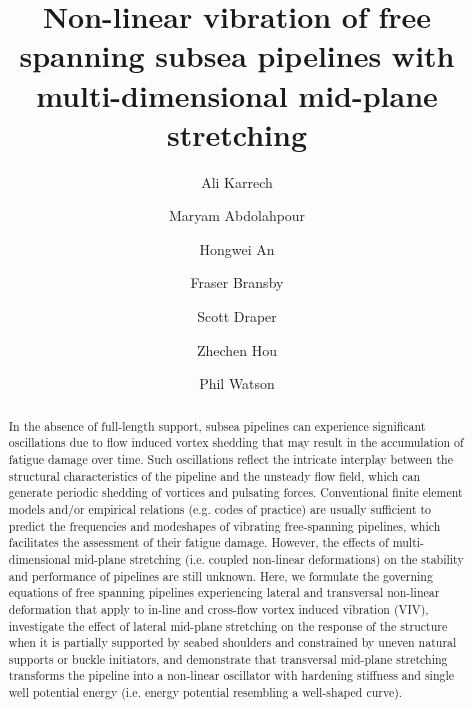 \documentclass[3p,doublespacing,authoryear,11pt]{elsarticle} %
\begin{document}
\begin{frontmatter}
\title{Non-linear vibration of free spanning subsea pipelines with multi-dimensional mid-plane stretching}   
\author[label1]{Ali Karrech}  
\author[label1,label2]{Maryam Abdolahpour}  
\author[label1]{Hongwei An}  
\author[label1,label2]{Fraser Bransby}  
\author[label1,label2]{Scott Draper}   
\author[label2]{Zhechen Hou}
\author[label2]{Phil Watson}  
%
\address[label1]{School of Engineering, University of Western Australia, 35 Stirling Hwy, Crawley WA 6009, Western Australia}
\address[label2]{Oceans Graduate School, University of Western Australia, 35 Stirling Hwy, Crawley WA 6009, Western Australia} 

\begin{abstract} 
In the absence of full-length support, subsea pipelines can experience significant oscillations due to flow induced vortex shedding that may result in the accumulation of fatigue damage over time. Such oscillations reflect the intricate interplay between the structural characteristics of the pipeline and the unsteady flow field, which can generate periodic shedding of vortices and pulsating forces. Conventional finite element models and/or empirical relations (e.g. codes of practice) are usually sufficient to predict the frequencies and modeshapes of vibrating free-spanning pipelines, which facilitates the assessment of their fatigue damage. However, the effects of multi-dimensional mid-plane stretching (i.e. coupled non-linear deformations) on the stability and performance of pipelines are still unknown. Here, we formulate the governing equations of free spanning pipelines experiencing lateral and transversal non-linear deformation that apply to in-line and cross-flow vortex induced vibration (VIV), investigate the effect of lateral mid-plane stretching on the response of the structure when it is partially supported by seabed shoulders and constrained by uneven natural supports or buckle initiators, and demonstrate that transversal mid-plane stretching transforms the pipeline into a non-linear oscillator with hardening stiffness and single well potential energy (i.e. energy potential resembling a well-shaped curve).  


\end{abstract}
\end{frontmatter}
\end{document}
